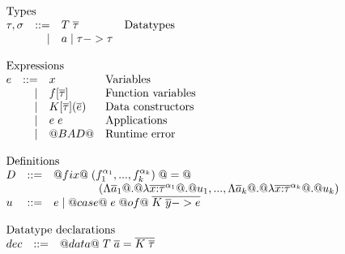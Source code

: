 \documentclass[preprint,nocopyrightspace]{sigplanconf}
\begin{document}
\newcommand{\ar}{\alpha}

\begin{figure}\small
\[\begin{array}{l} 
\begin{array}{lrll}
\multicolumn{3}{l}{\text{Types}} \\
\tau,\sigma & ::=  & T\;\taus & \text{Datatypes} \\ 
            & \mid & a \mid \tau -> \tau 
\end{array}\\ \\ 
\begin{array}{lrll}
\multicolumn{3}{l}{\text{Expressions}} \\
e  & ::=  & x            & \text{Variables} \\ 
   & \mid & f[\ol{\tau}] & \text{Function variables} \\ 
   & \mid & K[\ol{\tau}](\ol{e}) & \text{Data constructors} \\
   & \mid & e\;e         & \text{Applications} \\
   & \mid & @BAD@        & \text{Runtime error} \\ 
\end{array}\\ \\ 
\begin{array}{lrll}
\multicolumn{3}{l}{\text{Definitions}} \\
D   & ::= & @fix@\;(f_1^{\ar_1},...,f_k^{\ar_k})\;@=@ \\ 
    &     & \quad\quad\quad\quad (\Lambda\as_1 @.@ \lambda{\oln{x{:}\tau}{\ar_1}} @.@ u_1,...,
                                                \Lambda\as_k @.@ \lambda{\oln{x{:}\tau}{\ar_k}} @.@ u_k) \\
u   & ::= & e \mid @case@\;e\;@of@\;\ol{K\;\ol{y} -> e} \\ 
\end{array}\\ \\ 
\begin{array}{lrll}
\multicolumn{3}{l}{\text{Datatype declarations}} \\
dec & ::= & @data@\;T\;\ol{a} = \ol{K\;\taus}
\end{array}\\ \\ 
\begin{array}{lrll}

\end{array}
\end{array}\]
\end{figure}
\end{document}
